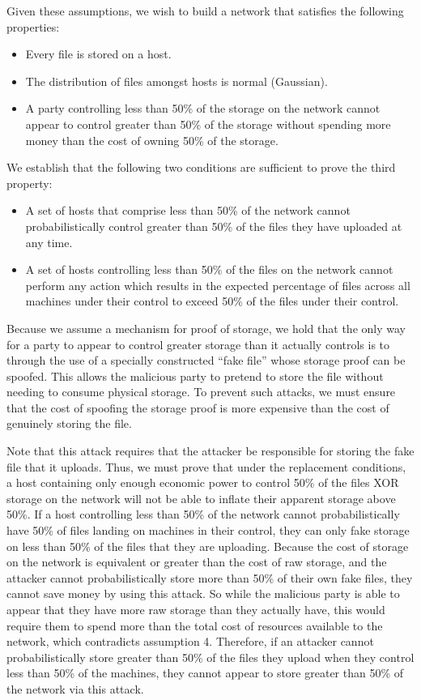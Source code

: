 \documentclass[twocolumn]{article}
\begin{document}
Given these assumptions, we wish to build a network that satisfies the following properties:
\begin{itemize}
	\item Every file is stored on a host.
    \item The distribution of files amongst hosts is normal (Gaussian).
	\item A party controlling less than 50\% of the storage on the network cannot appear to control greater than 50\% of the storage without spending more money than the cost of owning 50\% of the storage.
\end{itemize}

We establish that the following two conditions are sufficient to prove the third property:
\begin{itemize}
	\item A set of hosts that comprise less than 50\% of the network cannot probabilistically control greater than 50\% of the files they have uploaded at any time.
	\item A set of hosts controlling less than 50\% of the files on the network cannot perform any action which results in the expected percentage of files across all machines under their control to exceed 50\% of the files under their control.
\end{itemize}
Because we assume a mechanism for proof of storage, we hold that the only way for a party to appear to control greater storage than it actually controls is to through the use of a specially constructed ``fake file'' whose storage proof can be spoofed.
This allows the malicious party to pretend to store the file without needing to consume physical storage.
To prevent such attacks, we must ensure that the cost of spoofing the storage proof is more expensive than the cost of genuinely storing the file.

Note that this attack requires that the attacker be responsible for storing the fake file that it uploads.
Thus, we must prove that under the replacement conditions, a host containing only enough economic power to control 50\% of the files XOR storage on the network will not be able to inflate their apparent storage above 50\%.
If a host controlling less than 50\% of the network cannot probabilistically have 50\% of files landing on machines in their control, they can only fake storage on less than 50\% of the files that they are uploading.
Because the cost of storage on the network is equivalent or greater than the cost of raw storage, and the attacker cannot probabilistically store more than 50\% of their own fake files, they cannot save money by using this attack.
So while the malicious party is able to appear that they have more raw storage than they actually have, this would require them to spend more than the total cost of resources available to the network, which contradicts assumption 4.
Therefore, if an attacker cannot probabilistically store greater than 50\% of the files they upload when they control less than 50\% of the machines, they cannot appear to store greater than 50\% of the network via this attack.
\end{document}
